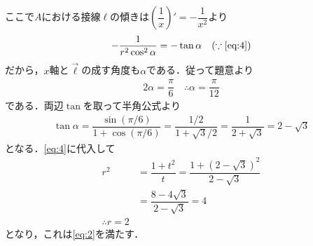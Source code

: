 \documentclass[../../main.tex]{subfiles}
\begin{document}
ここで$A$における接線$\ell$の傾きは$\left(\dfrac{1}{x}\right)'=-\dfrac{1}{x^2}$より
\begin{align}
  -\dfrac{1}{r^2\cos^2\alpha} = -\tan \alpha \quad (\because\text{\cref{eq:4}})
\end{align}
だから，$x$軸と$\vec{\ell}$の成す角度も$\alpha$である．従って題意より
\begin{align}
  2\alpha = \dfrac{\pi}{6}
  \quad\therefore
  \alpha = \dfrac{\pi}{12} \label{eq:5}
\end{align}
である．両辺$\tan$を取って半角公式より
\begin{align}
  \tan\alpha
  = \dfrac{\sin(\pi/6)}{1+\cos(\pi/6)}
  = \dfrac{1/2}{1+\sqrt{3}/2}
  = \dfrac{1}{2+\sqrt{3}}
  = 2-\sqrt{3} \label{eq:6}
\end{align}
となる．\cref{eq:4}に代入して
\begin{align}
  r^2
  & = \dfrac{1+t^2}{t}
  = \dfrac{1+\left(2-\sqrt{3}\right)^2}{2-\sqrt{3}} \\
  & = \dfrac{8-4\sqrt{3}}{2-\sqrt{3}}
  = 4 \\
  \therefore
  r = 2 \label{eq:7}
\end{align}
となり，これは\cref{eq:2}を満たす．
\end{document}
